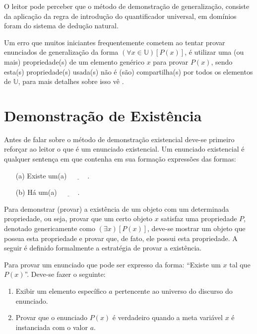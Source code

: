 \begin{rema}
	O leitor pode perceber que o método de demonstração de generalização, consiste da aplicação da regra de introdução do quantificador universal, em domínios foram do sistema de dedução natural.
\end{rema}

Um erro que muitos iniciantes frequentemente cometem ao tentar provar enunciados de generalização da forma $(\forall x \in \mathbb{U})[P(x)]$, é utilizar uma (ou mais) propriedade(s) de um elemento genérico $x$  para provar $P(x)$, sendo esta(s) propriedade(s) usada(s) não é (são) compartilha(s) por todos os elementos de $\mathbb{U}$, para mais detalhes sobre isso vê \cite{velleman2019comProvar}. 

\section{Demonstração de Existência}\label{sec:DemonstrandoExistencia}

Antes de falar sobre o método de demonstração existencial deve-se primeiro reforçar ao leitor o que é um enunciado existencial. Um enunciado existencial é qualquer sentença em que contenha em sua formação expressões das formas:
\begin{itemize}
	\item[(a)] Existe um(a) $\underline{\ \ \ \ \ \ \ \ \ \ \ \ }$.
	\item[(b)] Há um(a) $\underline{\ \ \ \ \ \ \ \ \ \ \ \ }$.
\end{itemize} 

Para demonstrar (provar) a existência de um objeto com um determinada propriedade, ou seja, provar que um certo objeto $x$ satisfaz uma propriedade $P$,  denotado genericamente como $(\exists x)[P(x)]$, deve-se mostrar um objeto que possua esta propriedade e provar que, de fato, ele possui esta propriedade. A seguir é definido formalmente a estratégia de provar a existência.

\begin{method}[existencialização]
	Para provar um enunciado que pode ser expresso da forma: ``Existe um $x$ tal que $P(x)$''. Deve-se fazer o seguinte:
	\begin{enumerate}
		\item Exibir um elemento específico $a$ pertencente ao universo do discurso do enunciado.
		\item Provar que o enunciado $P(x)$ é verdadeiro quando a meta variável $x$ é instanciada com o valor $a$.
	\end{enumerate}
\end{method}

